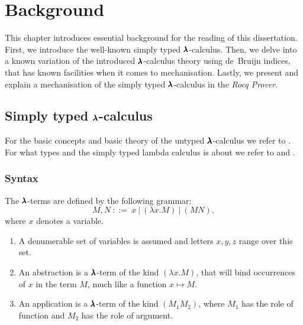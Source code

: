 \chapter{Background}
\label{c:background}


This chapter introduces essential background for the reading of this dissertation.
First, we introduce the well-known simply typed $\pmb{\lambda}$-calculus.
Then, we delve into a known variation of the introduced $\pmb{\lambda}$-calculus theory using de~Bruijn indices, that has known facilities when it comes to mechanisation.
Lastly, we present and explain a mechanisation of the simply typed $\pmb{\lambda}$-calculus in the \textit{Rocq Prover}.

\section{Simply typed $\pmb{\lambda}$-calculus}

For the basic concepts and basic theory of the untyped $\pmb{\lambda}$-calculus we refer to \cite{Barendregt1987}.
For what types and the simply typed lambda calculus is about we refer to \cite{Barendregt2013} and \cite{Hindley1997}.

\subsection{Syntax}

\begin{definition}
  The $\pmb{\lambda}$-terms are defined by the following grammar:
  \[ M, N \ ::= \ x \ | \ (\lambda x . M) \ | \ (M N) , \]
  where $x$ denotes a variable.
\end{definition}

\begin{remark} \hfill
  \begin{enumerate}
  \item A denumerable set of variables is assumed and letters $x, y, z$ range over this set.
  \item An abstraction is a $\pmb{\lambda}$-term of the kind $(\lambda x. M)$, that will bind occurrences of $x$ in the term $M$, much like a function $x \mapsto M$.
  \item An application is a $\pmb{\lambda}$-term of the kind $(M_1 M_2)$, where $M_1$ has the role of function and $M_2$ has the role of argument.
  \end{enumerate}
\end{remark}

